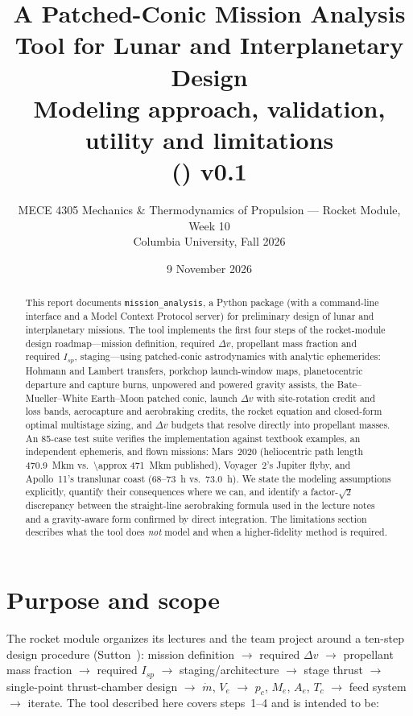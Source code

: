 \documentclass[11pt,a4paper]{article}
\title{\textbf{A Patched-Conic Mission Analysis Tool for Lunar and Interplanetary Design}\\[4pt]
\large Modeling approach, validation, utility and limitations\\[2pt]
\normalsize \code{sfmission} (\code{sfmission}) v0.1}
\author{MECE 4305 Mechanics \& Thermodynamics of Propulsion --- Rocket Module, Week 10\\
Columbia University, Fall 2026}
\date{9 November 2026}
\newcommand{\dv}{\Delta v}
\newcommand{\code}[1]{\texttt{#1}}
\newcommand{\pkg}{\code{mission\_analysis}}
\begin{document}
\maketitle

\begin{abstract}
\noindent
This report documents \pkg{}, a Python package (with a command-line interface and a Model
Context Protocol server) for preliminary design of lunar and interplanetary missions. The
tool implements the first four steps of the rocket-module design roadmap---mission definition,
required $\dv$, propellant mass fraction and required $I_{sp}$, staging---using patched-conic
astrodynamics with analytic ephemerides: Hohmann and Lambert transfers, porkchop launch-window
maps, planetocentric departure and capture burns, unpowered and powered gravity assists, the
Bate--Mueller--White Earth--Moon patched conic, launch $\dv$ with site-rotation credit and loss
bands, aerocapture and aerobraking credits, the rocket equation and closed-form optimal
multistage sizing, and $\dv$ budgets that resolve directly into propellant masses. An 85-case
test suite verifies the implementation against textbook examples, an independent ephemeris,
and flown missions: Mars~2020 (heliocentric path length \SI{470.9}{Mkm} vs.\ \SI{\approx 471}{Mkm}
published), Voyager~2's Jupiter flyby, and Apollo~11's translunar coast (68--73~h vs.\ 73.0~h).
We state the modeling assumptions explicitly, quantify their consequences where we can, and
identify a factor-$\sqrt{2}$ discrepancy between the straight-line aerobraking formula used in
the lecture notes and a gravity-aware form confirmed by direct integration. The limitations
section describes what the tool does \emph{not} model and when a higher-fidelity method is required.
\end{abstract}

\setcounter{tocdepth}{1}
\tableofcontents
\clearpage

\section{Purpose and scope}
The rocket module organizes its lectures and the team project around a ten-step design
procedure (Sutton~\cite{sutton}): mission definition $\rightarrow$ required $\dv$ $\rightarrow$
propellant mass fraction $\rightarrow$ required $I_{sp}$ $\rightarrow$ staging/architecture
$\rightarrow$ stage thrust $\rightarrow$ single-point thrust-chamber design $\rightarrow$
$\dot m$, $V_e$ $\rightarrow$ $p_c$, $M_e$, $A_e$, $T_c$ $\rightarrow$ feed system
$\rightarrow$ iterate. The tool described here covers steps~1--4 and is intended to be:
\end{document}
